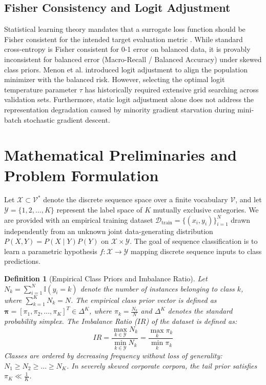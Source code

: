 \documentclass[final,5p,times,twocolumn]{elsarticle}
\newtheorem{definition}{Definition}
\begin{document}
\subsection{Fisher Consistency and Logit Adjustment}
Statistical learning theory mandates that a surrogate loss function should be Fisher consistent for the intended target evaluation metric \cite{menon2021longtail}. While standard cross-entropy is Fisher consistent for 0-1 error on balanced data, it is provably inconsistent for balanced error (Macro-Recall / Balanced Accuracy) under skewed class priors. Menon et al. \cite{menon2021longtail} introduced logit adjustment to align the population minimizer with the balanced risk. However, selecting the optimal logit temperature parameter $\tau$ has historically required extensive grid searching across validation sets. Furthermore, static logit adjustment alone does not address the representation degradation caused by minority gradient starvation during mini-batch stochastic gradient descent.

\section{Mathematical Preliminaries and Problem Formulation}
\label{sec:preliminaries}

Let $\mathcal{X} \subset \mathcal{V}^*$ denote the discrete sequence space over a finite vocabulary $\mathcal{V}$, and let $\mathcal{Y} = \{1, 2, \dots, K\}$ represent the label space of $K$ mutually exclusive categories. We are provided with an empirical training dataset $\mathcal{D}_{\text{train}} = \{(x_i, y_i)\}_{i=1}^N$ drawn independently from an unknown joint data-generating distribution $P(X, Y) = P(X \mid Y)P(Y)$ on $\mathcal{X} \times \mathcal{Y}$. The goal of sequence classification is to learn a parametric hypothesis $f: \mathcal{X} \to \mathcal{Y}$ mapping discrete sequence inputs to class predictions.

\begin{definition}[Empirical Class Priors and Imbalance Ratio]
Let $N_k = \sum_{i=1}^N \mathbb{I}(y_i = k)$ denote the number of instances belonging to class $k$, where $\sum_{k=1}^K N_k = N$. The empirical class prior vector is defined as $\boldsymbol{\pi} = [\pi_1, \pi_2, \dots, \pi_K]^T \in \Delta^K$, where $\pi_k = \frac{N_k}{N}$ and $\Delta^K$ denotes the standard probability simplex. The Imbalance Ratio ($IR$) of the dataset is defined as:
\begin{equation}
    IR = \frac{\max_{k \in \mathcal{Y}} N_k}{\min_{k \in \mathcal{Y}} N_k} = \frac{\max_{k} \pi_k}{\min_{k} \pi_k}
\end{equation}
Classes are ordered by decreasing frequency without loss of generality: $N_1 \ge N_2 \ge \dots \ge N_K$. In severely skewed corporate corpora, the tail prior satisfies $\pi_K \ll \frac{1}{K}$.
\end{definition}
\end{document}
